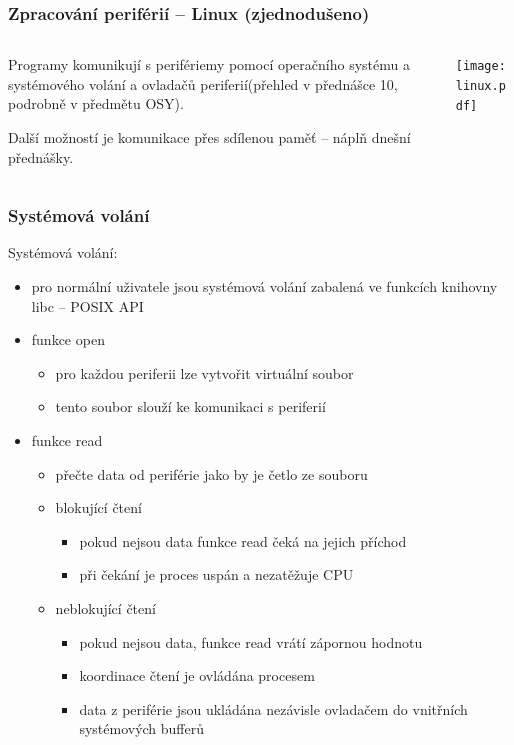 \documentclass{beamer}
\begin{document}
\begin{frame}
\frametitle{Zpracování periférií -- Linux (zjednodušeno)}
\begin{columns}
\begin{column}{0.4\textwidth}
Programy komunikují s perifériemy pomocí operačního systému a systémového volání a ovladačů periferií(přehled v přednášce 10, podrobně v předmětu OSY).

\bigskip
Další možností je komunikace přes sdílenou paměť -- náplň dnešní přednášky.
\end{column}
\begin{column}{0.58\textwidth}  
\texttt{[image: linux.pdf]}
\end{column}
\end{columns}
\end{frame}


\begin{frame}
\frametitle{Systémová volání}

Systémová volání:
\begin{itemize}
\item pro normální uživatele jsou systémová volání zabalená ve funkcích knihovny libc -- POSIX API
\item funkce open
    \begin{itemize}
    \item pro každou periferii lze vytvořit virtuální soubor
    \item tento soubor slouží ke komunikaci s periferií
    \end{itemize}
\item funkce read 
    \begin{itemize}
    \item přečte data od periférie jako by je četlo ze souboru
    \item blokující čtení
        \begin{itemize}
        \item pokud nejsou data funkce read čeká na jejich příchod
        \item při čekání je proces uspán a nezatěžuje CPU
        \end{itemize}
    \item neblokující čtení
        \begin{itemize}
        \item pokud nejsou data, funkce read vrátí zápornou hodnotu 
        \item koordinace čtení je ovládána procesem
        \item data z periférie jsou ukládána nezávisle ovladačem do vnitřních systémových bufferů
        \end{itemize}
    \end{itemize}
\end{itemize}
\end{frame}
\end{document}
